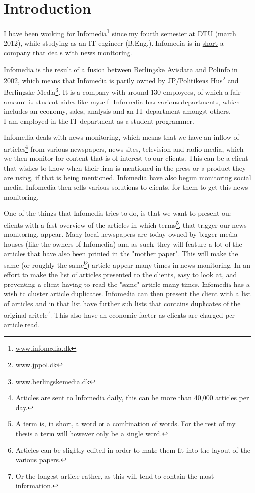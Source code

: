 \chapter{Introduction}
I have been working for Infomedia\footnote{\url{www.infomedia.dk}} since my fourth semester at DTU (march 2012), while studying as an IT engineer (B.Eng.). Infomedia is in \underline{short} a company that deals with news monitoring.

Infomedia is the result of a fusion between Berlingske Avisdata and Polinfo in 2002, which means that Infomedia is partly owned by JP/Politikens Hus\footnote{\url{www.jppol.dk}} and Berlingske Media\footnote{\url{www.berlingskemedia.dk}}. It is a company with around 130 employees, of which a fair amount is student aides like myself. Infomedia has various departments, which includes an economy, sales, analysis and an IT department amongst others.\\
I am employed in the IT department as a student programmer.

Infomedia deals with news monitoring, which means that we have an inflow of articles\footnote{Articles are sent to Infomedia daily, this can be more than 40,000 articles per day.} from various newspapers, news sites, television and radio media, which we then monitor for content that is of interest to our clients. This can be a client that wishes to know when their firm is mentioned in the press or a product they are using, if that is being mentioned. Infomedia have also begun monitoring social media. Infomedia then sells various solutions to clients, for them to get this news monitoring.

One of the things that Infomedia tries to do, is that we want to present our clients with a fast overview of the articles in which terms\footnote{A term is, in short, a word or a combination of words. For the rest of my thesis a term will however only be a single word.}, that trigger our news monitoring, appear. Many local newspapers are today owned by bigger media houses (like the owners of Infomedia) and as such, they will feature a lot of the articles that have also been printed in the "mother paper". This will make the same (or roughly the same\footnote{Articles can be slightly edited in order to make them fit into the layout of the various papers.}) article appear many times in news monitoring. In an effort to make the list of articles presented to the clients, easy to look at, and preventing a client having to read the "same" article many times, Infomedia has a wish to cluster article duplicates. Infomedia can then present the client with a list of articles and in that list have further sub lists that contains duplicates of the original aritcle\footnote{Or the longest article rather, as this will tend to contain the most information.}. This also have an economic factor as clients are charged per article read.

